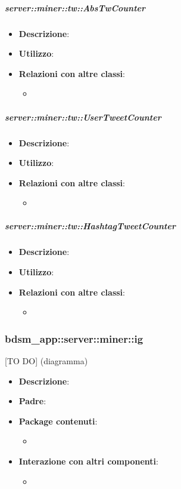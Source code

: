	\subparagraph{server::miner::tw::AbsTwCounter} %
		\label{subp:server_miner_tw_AbsTwCounter}
			\begin{itemize}
				\item \textbf{Descrizione}:
				\item \textbf{Utilizzo}: 
				\item \textbf{Relazioni con altre classi}:
					\begin{itemize}
						\item 
					\end{itemize}
			\end{itemize}
		
	\subparagraph{server::miner::tw::UserTweetCounter} %
		\label{subp:server_miner_tw_UserTweetCounter}
			\begin{itemize}
				\item \textbf{Descrizione}:
				\item \textbf{Utilizzo}: 
				\item \textbf{Relazioni con altre classi}:
					\begin{itemize}
						\item 
					\end{itemize}
			\end{itemize}
		
		
	\subparagraph{server::miner::tw::HashtagTweetCounter} %
		\label{subp:server_miner_tw_HashtagTweetCounter}
			\begin{itemize}
				\item \textbf{Descrizione}:
				\item \textbf{Utilizzo}: 
				\item \textbf{Relazioni con altre classi}:
					\begin{itemize}
						\item 
					\end{itemize}
			\end{itemize}

\subsubsection{bdsm\_app::server::miner::ig} %
\label{ssub:bdsm_app_server_miner_ig}
[TO DO] (diagramma) \newline \newline

\begin{itemize}
  \item \textbf{Descrizione}:
  \item \textbf{Padre}:
  \item \textbf{Package contenuti}:
  	\begin{itemize}
  		\item
  	\end{itemize}
  \item \textbf{Interazione con altri componenti}:
  	\begin{itemize}
  		\item  	
  	\end{itemize}
\end{itemize}	


